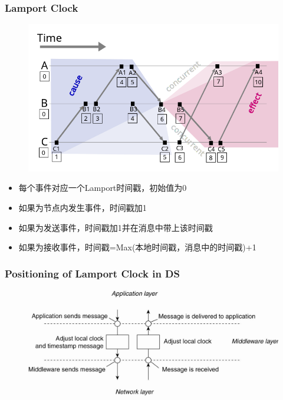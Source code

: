 \begin{frame}
    \frametitle{Lamport Clock}
    \begin{figure}
        \centering
        \includegraphics[scale=0.3]{./figures/Lamport-Clock}
    \end{figure}
    \begin{itemize}
        \item 每个事件对应一个Lamport时间戳，初始值为0
        \item 如果为节点内发生事件，时间戳加1
        \item 如果为发送事件，时间戳加1并在消息中带上该时间戳
        \item 如果为接收事件，时间戳=Max(本地时间戳，消息中的时间戳)+1
    \end{itemize}
\end{frame}

\begin{frame}
    \frametitle{Positioning of Lamport Clock in DS}
    \begin{figure}
        \centering
        \includegraphics[scale=0.32]{./figures/lamport-position.jpg}
    \end{figure}
\end{frame}

